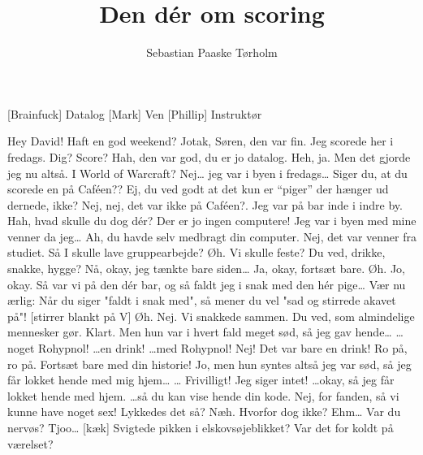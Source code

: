 \documentclass[a4paper,11pt]{article}
\title{Den dér om scoring}
\author{Sebastian Paaske Tørholm}
\begin{document}
\maketitle

\begin{roles}
[Brainfuck] Datalog
[Mark] Ven
[Phillip] Instruktør
\end{roles}


\begin{sketch}

 Hey David! Haft en god weekend?
 Jotak, Søren, den var fin. Jeg scorede her i fredags.
 Dig? Score? Hah, den var god, du er jo datalog.
 Heh, ja. Men det gjorde jeg nu altså.
 I World of Warcraft?
 Nej\ldots{} jeg var i byen i fredags\ldots{}
 Siger du, at du scorede en på Caféen?? Ej, du ved godt at det kun er ``piger'' der hænger ud dernede, ikke?
 Nej, nej, det var ikke på Caféen?. Jeg var på bar inde i indre by.
 Hah, hvad skulle du dog dér? Der er jo ingen computere!
 Jeg var i byen med mine venner da jeg\ldots{}
 Ah, du havde selv medbragt din computer.
 Nej, det var venner fra studiet.
 Så I skulle lave gruppearbejde?
 Øh. Vi skulle feste? Du ved, drikke, snakke, hygge?
 Nå, okay, jeg tænkte bare siden\ldots{} Ja, okay, fortsæt bare.
 Øh. Jo, okay. Så var vi på den dér bar, og så faldt jeg i snak med den hér pige\ldots{}
 Vær nu ærlig: Når du siger "faldt i snak med", så mener du vel "sad og stirrede akavet på"!
[stirrer blankt på V] Øh. Nej. Vi snakkede sammen. Du ved, som almindelige mennesker gør.
 Klart.
 Men hun var i hvert fald meget sød, så jeg gav hende\ldots{}
 \ldots{}noget Rohypnol!
 \ldots{}en drink! 
 \ldots{}med Rohypnol!
 Nej!  Det var bare en drink!
 Ro på, ro på. Fortsæt bare med din historie!
 Jo, men hun syntes altså jeg var sød, så jeg får lokket hende med mig hjem\ldots{}
 \ldots{}
 Frivilligt!
 Jeg siger intet!
 \ldots{}okay, så jeg får lokket hende med hjem.
 \ldots{}så du kan vise hende din kode.
 Nej, for fanden, så vi kunne have noget sex!
 Lykkedes det så?
 Næh.
 Hvorfor dog ikke? 
 Ehm\ldots{}
 Var du nervøs?
 Tjoo\ldots{}
[kæk] Svigtede pikken i elskovsøjeblikket? Var det for koldt på værelset?

\end{sketch}
\end{document}
